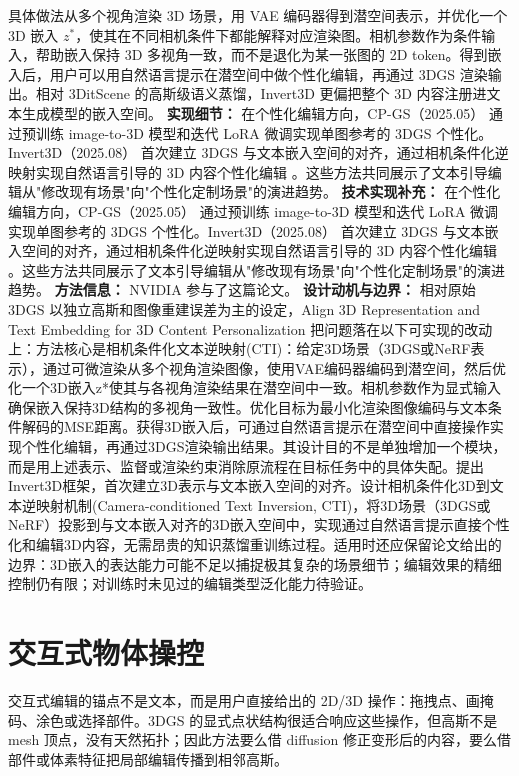 具体做法从多个视角渲染 3D 场景，用 VAE 编码器得到潜空间表示，并优化一个 3D 嵌入 $z^*$，使其在不同相机条件下都能解释对应渲染图。相机参数作为条件输入，帮助嵌入保持 3D 多视角一致，而不是退化为某一张图的 2D token。得到嵌入后，用户可以用自然语言提示在潜空间中做个性化编辑，再通过 3DGS 渲染输出。相对 3DitScene 的高斯级语义蒸馏，Invert3D 更偏把整个 3D 内容注册进文本生成模型的嵌入空间。
\textbf{实现细节：} 在个性化编辑方向，CP-GS（2025.05） 通过预训练 image-to-3D 模型和迭代 LoRA 微调实现单图参考的 3DGS 个性化。Invert3D（2025.08） 首次建立 3DGS 与文本嵌入空间的对齐，通过相机条件化逆映射实现自然语言引导的 3D 内容个性化编辑 。这些方法共同展示了文本引导编辑从"修改现有场景"向"个性化定制场景"的演进趋势。
\textbf{技术实现补充：} 在个性化编辑方向，CP-GS（2025.05） 通过预训练 image-to-3D 模型和迭代 LoRA 微调实现单图参考的 3DGS 个性化。Invert3D（2025.08） 首次建立 3DGS 与文本嵌入空间的对齐，通过相机条件化逆映射实现自然语言引导的 3D 内容个性化编辑 。这些方法共同展示了文本引导编辑从"修改现有场景"向"个性化定制场景"的演进趋势。
\textbf{方法信息：} NVIDIA 参与了这篇论文。
\textbf{设计动机与边界：} 相对原始 3DGS 以独立高斯和图像重建误差为主的设定，Align 3D Representation and Text Embedding for 3D Content Personalization 把问题落在以下可实现的改动上：方法核心是相机条件化文本逆映射(CTI)：给定3D场景（3DGS或NeRF表示），通过可微渲染从多个视角渲染图像，使用VAE编码器编码到潜空间，然后优化一个3D嵌入z*使其与各视角渲染结果在潜空间中一致。相机参数作为显式输入确保嵌入保持3D结构的多视角一致性。优化目标为最小化渲染图像编码与文本条件解码的MSE距离。获得3D嵌入后，可通过自然语言提示在潜空间中直接操作实现个性化编辑，再通过3DGS渲染输出结果。其设计目的不是单独增加一个模块，而是用上述表示、监督或渲染约束消除原流程在目标任务中的具体失配。提出Invert3D框架，首次建立3D表示与文本嵌入空间的对齐。设计相机条件化3D到文本逆映射机制(Camera-conditioned Text Inversion, CTI)，将3D场景（3DGS或NeRF）投影到与文本嵌入对齐的3D嵌入空间中，实现通过自然语言提示直接个性化和编辑3D内容，无需昂贵的知识蒸馏重训练过程。适用时还应保留论文给出的边界：3D嵌入的表达能力可能不足以捕捉极其复杂的场景细节；编辑效果的精细控制仍有限；对训练时未见过的编辑类型泛化能力待验证。

\section{交互式物体操控}

交互式编辑的锚点不是文本，而是用户直接给出的 2D/3D 操作：拖拽点、画掩码、涂色或选择部件。3DGS 的显式点状结构很适合响应这些操作，但高斯不是 mesh 顶点，没有天然拓扑；因此方法要么借 diffusion 修正变形后的内容，要么借部件或体素特征把局部编辑传播到相邻高斯。
